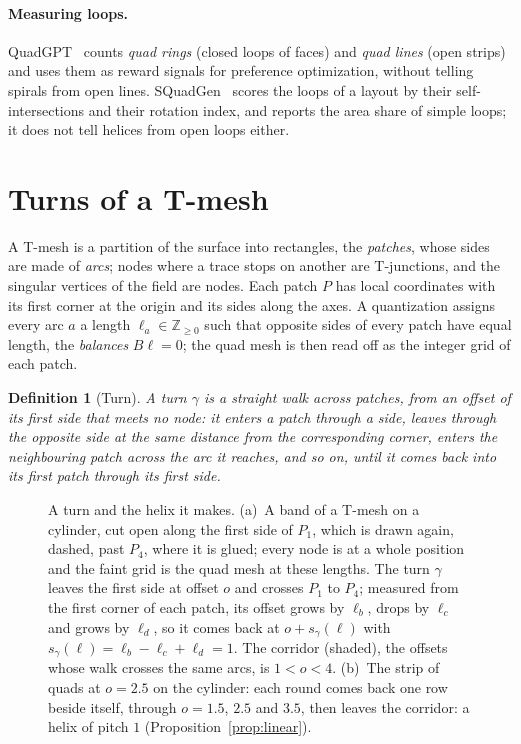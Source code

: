 \documentclass[11pt,a4paper]{article}
\newtheorem{definition}{Definition}
\newcommand{\Z}{\mathbb{Z}}
\newcommand{\shift}{s}
\begin{document}
\paragraph{Measuring loops.}
QuadGPT~\cite{liu2025quadgpt} counts \emph{quad rings} (closed loops of
faces) and \emph{quad lines} (open strips) and uses them as reward signals
for preference optimization, without telling spirals from open lines.
SQuadGen~\cite{kong2026squadgen} scores the loops of a layout by their
self-intersections and their rotation index, and reports the area share of
simple loops; it does not tell helices from open loops either.

\section{Turns of a T-mesh}\label{sec:turns}

A T-mesh is a partition of the surface into rectangles, the \emph{patches},
whose sides are made of \emph{arcs}; nodes where a trace stops on another are
T-junctions, and the singular vertices of the field are nodes. Each patch
$P$ has local coordinates with its first corner at the origin and its sides
along the axes. A quantization assigns every arc $a$ a length $\ell_a \in
\Z_{\ge 0}$ such that opposite sides of every patch have equal length, the
\emph{balances} $B\ell = 0$; the quad mesh is then read off as the integer
grid of each patch.

\begin{definition}[Turn]
A \emph{turn} $\gamma$ is a straight walk across patches, from an offset of
its first side that meets no node: it enters a patch through a side, leaves
through the opposite side at the same distance from the corresponding
corner, enters the neighbouring patch across the arc it reaches, and so on,
until it comes back into its first patch through its first side.
\end{definition}

\begin{figure}[t]
\centering

\caption{A turn and the helix it makes. (a)~A band of a T-mesh on a
cylinder, cut open along the first side of $P_1$, which is drawn again,
dashed, past $P_4$, where it is glued; every node is at a whole position and
the faint grid is the quad mesh at these lengths. The turn $\gamma$ leaves
the first side at offset $o$ and crosses $P_1$ to $P_4$; measured from the
first corner of each patch, its offset grows by $\ell_b$, drops by $\ell_c$
and grows by $\ell_d$, so it comes back at $o + \shift_\gamma(\ell)$ with
$\shift_\gamma(\ell) = \ell_b - \ell_c + \ell_d = 1$. The corridor
(shaded), the offsets whose walk crosses the same arcs, is $1 < o < 4$.
(b)~The strip of quads at $o = 2.5$ on the cylinder: each round comes back
one row beside itself, through $o = 1.5$, $2.5$ and $3.5$, then leaves the
corridor: a helix of pitch $1$ (Proposition~\ref{prop:linear}).}
\label{fig:turn}
\end{figure}
\end{document}
